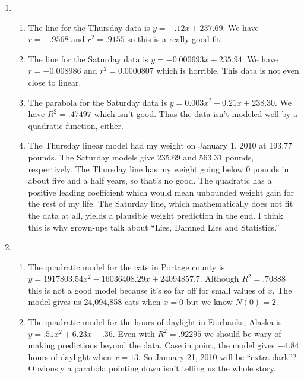 \begin{enumerate}
\setcounter{enumi}{\value{HW}}

\item \begin{enumerate}

\item The line for the Thursday data is $y = -.12x + 237.69$.  We have $r = -.9568$ and $r^{2} = .9155$ so this is a really good fit.

\item The line for the Saturday data is $y = -0.000693x + 235.94$.  We have $r = -0.008986$ and $r^{2} = 0.0000807$ which is horrible.  This data is not even close to linear.  

\item The parabola for the Saturday data is $y = 0.003x^{2} - 0.21x + 238.30$.  We have $R^{2} = .47497$ which isn't good.  Thus the data isn't modeled well by a quadratic function, either.

\item The Thursday linear model had my weight on January 1, 2010 at 193.77 pounds.  The Saturday models give 235.69 and 563.31 pounds, respectively.  The Thursday line has my weight going below 0 pounds in about five and a half years, so that's no good.  The quadratic has a positive leading coefficient which would mean unbounded weight gain for the rest of my life.  The Saturday line, which mathematically does not fit the data at all, yields a plausible weight prediction in the end.  I think this is why grown-ups talk about ``Lies, Damned Lies and Statistics.''

\end{enumerate}

\item \begin{enumerate}

\item The quadratic model for the cats in Portage county is $y = 1917803.54x^{2} - 16036408.29x + 24094857.7$.  Although $R^{2} = .70888$ this is not a good model because it's so far off for small values of $x$.  The model gives us 24,094,858 cats when $x = 0$ but we know $N(0) = 2$.

\item The quadratic model for the hours of daylight in Fairbanks, Alaska is $y = .51x^{2} + 6.23x - .36$.  Even with $R^{2} = .92295$ we should be wary of making predictions beyond the data.  Case in point, the model gives $-4.84$ hours of daylight when $x = 13$.  So January 21, 2010 will be ``extra dark''?  Obviously a parabola pointing down isn't telling us the whole story.

\end{enumerate}

\setcounter{HW}{\value{enumi}}
\end{enumerate}

